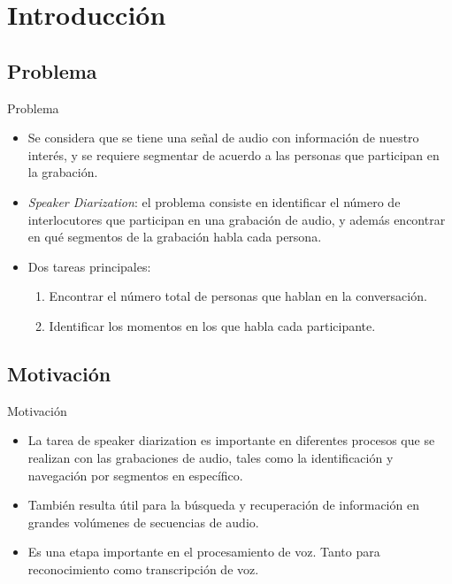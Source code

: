 

\section{Introducción}

\subsection{Problema}
\begin{frame}{Problema}

\begin{itemize}
    \itemsep1em
    \item Se considera que se tiene una señal de audio con información de nuestro interés, y se requiere segmentar de acuerdo a las personas que participan en la grabación.

    \item \alert{\textit{Speaker Diarization}}: el problema consiste en identificar el número de interlocutores que participan en una grabación de audio, y además encontrar en qué segmentos de la grabación habla cada persona.

    \item Dos tareas principales: 
    \begin{enumerate}
        \item Encontrar el número total de personas que hablan en la conversación.
        \item Identificar los momentos en los que habla cada participante.
    \end{enumerate}
  \end{itemize}

\end{frame}

\subsection{Motivación}

\begin{frame}{Motivación}
  \begin{itemize}
    \itemsep1em
    \item  La tarea de speaker diarization es importante en diferentes procesos que se realizan con las grabaciones de audio, tales como la identificación y navegación por segmentos en específico.

    \item También resulta útil para la búsqueda y recuperación de información en grandes volúmenes de secuencias de audio.
  
    \item Es una etapa importante en el procesamiento de voz. Tanto para reconocimiento como transcripción de voz.
    
  \end{itemize}
\end{frame}

